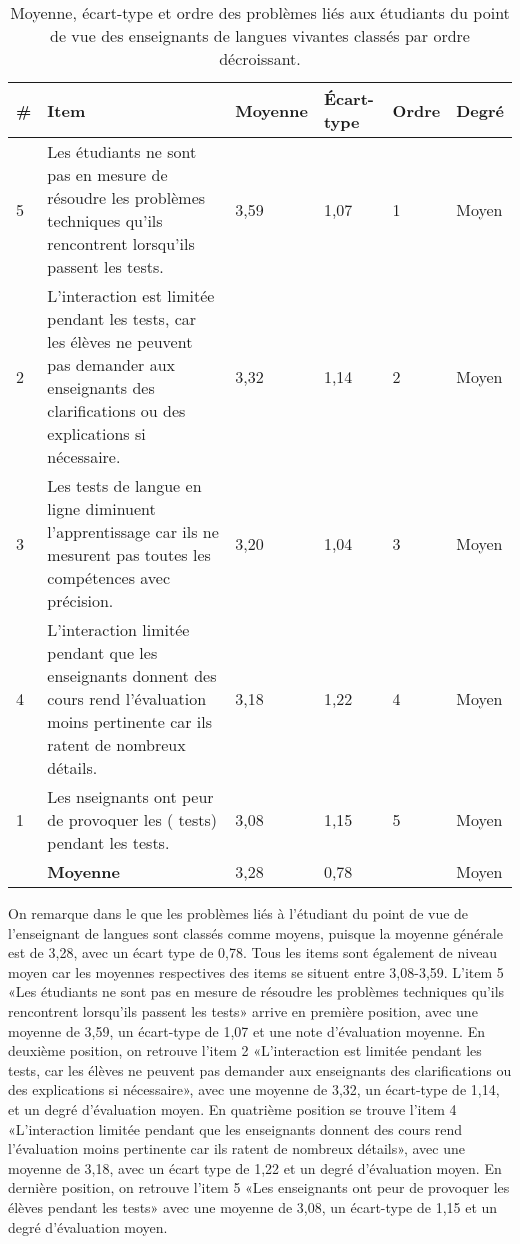 \documentclass[french]{textolivre}
\begin{document}
\begin{table}[h!]
\centering
\begin{threeparttable}
\centering
\small
\caption{Moyenne, écart-type et ordre des problèmes liés aux étudiants du point de vue des enseignants de langues vivantes classés par ordre décroissant.}
\label{tab6}
\begin{tabular}{lp{7.5cm}llll}
\toprule
\# & Item & Moyenne & Écart-type & Ordre & Degré \\
\midrule
5 & Les étudiants ne sont pas en mesure de résoudre les problèmes techniques qu'ils rencontrent lorsqu'ils passent les tests. & 3,59 & 1,07 & 1 & Moyen \\
2 & L'interaction est limitée pendant les tests, car les élèves ne peuvent pas demander aux enseignants des clarifications ou des explications si nécessaire. & 3,32 & 1,14 & 2 & Moyen \\
3 & Les tests de langue en ligne diminuent l'apprentissage car ils ne mesurent pas toutes les compétences avec précision. & 3,20 & 1,04 & 3 & Moyen \\
4 & L'interaction limitée pendant que les enseignants donnent des cours rend l’évaluation moins pertinente car ils ratent de nombreux détails. & 3,18 & 1,22 & 4 & Moyen \\
1 & Les nseignants ont peur de provoquer les ( tests) pendant les tests. & 3,08 & 1,15 & 5 & Moyen \\
 & \textbf{Moyenne} & 3,28 & 0,78 & & Moyen \\
\bottomrule
\end{tabular}%
\end{threeparttable}
\end{table}

On remarque dans le  que les problèmes liés à l'étudiant du point de vue de l'enseignant de langues sont classés comme moyens, puisque la moyenne générale est de 3,28, avec un écart type de 0,78. Tous les items sont également de niveau moyen car les moyennes respectives des items se situent entre 3,08-3,59. L’item 5 «Les étudiants ne sont pas en mesure de résoudre les problèmes techniques qu'ils rencontrent lorsqu'ils passent les tests» arrive en première position, avec une moyenne de 3,59, un écart-type de 1,07 et une note d'évaluation moyenne. En deuxième position, on retrouve l’item 2 «L'interaction est limitée pendant les tests, car les élèves ne peuvent pas demander aux enseignants des clarifications ou des explications si nécessaire», avec une moyenne de 3,32, un écart-type de 1,14, et un degré d'évaluation moyen. En quatrième position se trouve l’item 4 «L'interaction limitée pendant que les enseignants donnent des cours rend l’évaluation moins pertinente car ils ratent de nombreux détails», avec une moyenne de 3,18, avec un écart type de 1,22 et un degré d'évaluation moyen. En dernière position, on retrouve l’item 5 «Les enseignants ont peur de provoquer les élèves pendant les tests» avec une moyenne de 3,08, un écart-type de 1,15 et un degré d'évaluation moyen.
\end{document}
